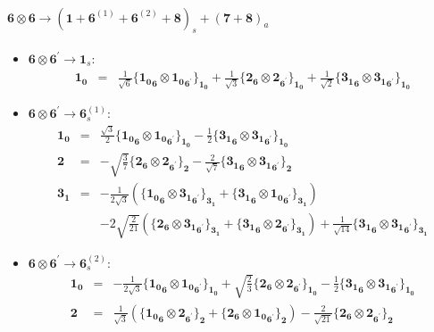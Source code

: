 \documentclass[english]{article}
\newcommand{\subcg}[3]{\big\{ {#1}\otimes{#2}\big\}^{}_{#3}}
\newcommand{\rep}[1]{\mathbf{#1}}
\begin{document}
\paragraph*{\Large $\rep{6}\otimes\rep{6}\to\left(\rep{1}+\rep{6}^{(1)}+\rep{6}^{(2)}+\rep{8}\right)_s+\left(\rep{7}+\rep{8}\right)_a$}
\begin{itemize}
\item $\rep{6}\otimes\rep{6}^{\prime}\to\rep{1}_{s}$:
\begin{eqnarray*}
\rep{1_0} &=& \frac{1}{\sqrt{6}}\subcg{\rep{1_0}_{\rep{6}}}{\rep{1_0}_{\rep{6}^{\prime}}}{\rep{1_0}}+\frac{1}{\sqrt{3}}\subcg{\rep{2}_{\rep{6}}}{\rep{2}_{\rep{6}^{\prime}}}{\rep{1_0}}+\frac{1}{\sqrt{2}}\subcg{\rep{3_1}_{\rep{6}}}{\rep{3_1}_{\rep{6}^{\prime}}}{\rep{1_0}}
\end{eqnarray*}
\item $\rep{6}\otimes\rep{6}^{\prime}\to\rep{6}_{s}^{(1)}$:
\begin{eqnarray*}
\rep{1_0} &=& \frac{\sqrt{3}}{2}\subcg{\rep{1_0}_{\rep{6}}}{\rep{1_0}_{\rep{6}^{\prime}}}{\rep{1_0}}-\frac{1}{2}\subcg{\rep{3_1}_{\rep{6}}}{\rep{3_1}_{\rep{6}^{\prime}}}{\rep{1_0}}
\\
\rep{2} &=& -\sqrt{\frac{3}{7}}\subcg{\rep{2}_{\rep{6}}}{\rep{2}_{\rep{6}^{\prime}}}{\rep{2}}-\frac{2}{\sqrt{7}}\subcg{\rep{3_1}_{\rep{6}}}{\rep{3_1}_{\rep{6}^{\prime}}}{\rep{2}}
\\
\rep{3_1} &=& -\frac{1}{2 \sqrt{3}}\left(\subcg{\rep{1_0}_{\rep{6}}}{\rep{3_1}_{\rep{6}^{\prime}}}{\rep{3_1}}+\subcg{\rep{3_1}_{\rep{6}}}{\rep{1_0}_{\rep{6}^{\prime}}}{\rep{3_1}}\right) \\ 
 & & -2 \sqrt{\frac{2}{21}}\left(\subcg{\rep{2}_{\rep{6}}}{\rep{3_1}_{\rep{6}^{\prime}}}{\rep{3_1}}+\subcg{\rep{3_1}_{\rep{6}}}{\rep{2}_{\rep{6}^{\prime}}}{\rep{3_1}}\right)+\frac{1}{\sqrt{14}}\subcg{\rep{3_1}_{\rep{6}}}{\rep{3_1}_{\rep{6}^{\prime}}}{\rep{3_1}}
\end{eqnarray*}
\item $\rep{6}\otimes\rep{6}^{\prime}\to\rep{6}_{s}^{(2)}$:
\begin{eqnarray*}
\rep{1_0} &=& -\frac{1}{2 \sqrt{3}}\subcg{\rep{1_0}_{\rep{6}}}{\rep{1_0}_{\rep{6}^{\prime}}}{\rep{1_0}}+\sqrt{\frac{2}{3}}\subcg{\rep{2}_{\rep{6}}}{\rep{2}_{\rep{6}^{\prime}}}{\rep{1_0}}-\frac{1}{2}\subcg{\rep{3_1}_{\rep{6}}}{\rep{3_1}_{\rep{6}^{\prime}}}{\rep{1_0}}
\\
\rep{2} &=& \frac{1}{\sqrt{3}}\left(\subcg{\rep{1_0}_{\rep{6}}}{\rep{2}_{\rep{6}^{\prime}}}{\rep{2}}+\subcg{\rep{2}_{\rep{6}}}{\rep{1_0}_{\rep{6}^{\prime}}}{\rep{2}}\right)-\frac{2}{\sqrt{21}}\subcg{\rep{2}_{\rep{6}}}{\rep{2}_{\rep{6}^{\prime}}}{\rep{2}} \\ 

\end{eqnarray*}
\end{itemize}
\end{document}
